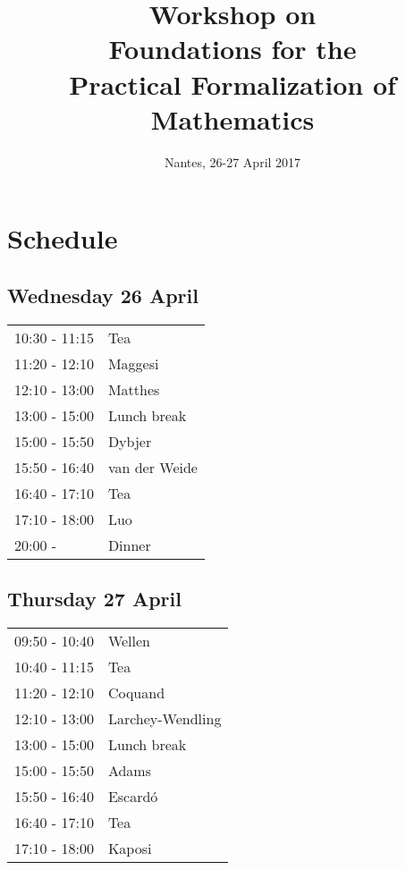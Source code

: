 \documentclass[a4paper,10pt]{scrartcl}
\title{Workshop on \\ Foundations for the \\ Practical Formalization of Mathematics}
\author{}
\begin{document}
\date{Nantes, 26-27 April 2017}
\maketitle

% 

\section*{Schedule}

\subsection*{Wednesday 26 April}

\begin{tabular}{ll}

10:30 - 11:15 & Tea \\
11:20 - 12:10 & Maggesi \\
12:10 - 13:00  & Matthes \\
13:00 - 15:00  & Lunch break\\
15:00 - 15:50  & Dybjer\\
15:50 - 16:40  & van der Weide \\
16:40 - 17:10  & Tea \\
17:10 - 18:00  & Luo \\
20:00 -        & Dinner
\end{tabular}

\subsection*{Thursday 27 April}

\begin{tabular}{ll}

09:50 - 10:40 & Wellen \\
10:40 - 11:15 & Tea \\
11:20 - 12:10 & Coquand \\
12:10 - 13:00 & Larchey-Wendling \\
13:00 - 15:00 & Lunch break \\
15:00 - 15:50 & Adams \\
15:50 - 16:40 & Escardó \\
16:40 - 17:10 & Tea \\
17:10 - 18:00 & Kaposi \\ 
\end{tabular}
  
\end{document}
